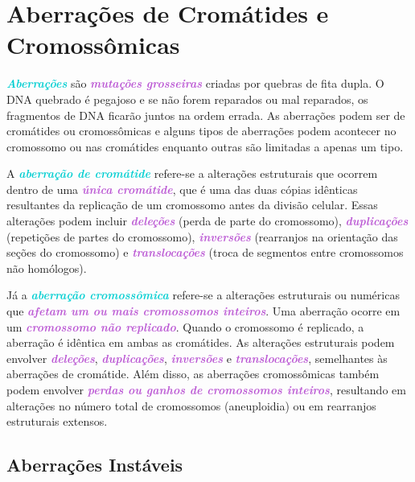 \documentclass[11pt,a4paper]{article}
\begin{document}
\section{Aberrações de Cromátides e Cromossômicas}

	\textcolor{DarkTurquoise}{\textbf{\textit{Aberrações}}} são \textcolor{MediumOrchid}{\textbf{\textit{mutações grosseiras}}} criadas por quebras de fita dupla. O DNA quebrado é pegajoso e se não forem reparados ou mal reparados, os fragmentos de DNA ficarão juntos na ordem errada. As aberrações podem ser de cromátides ou cromossômicas e alguns tipos de aberrações podem acontecer no cromossomo ou nas cromátides enquanto outras são limitadas a apenas um tipo.

	A \textcolor{DarkTurquoise}{\textbf{\textit{aberração de cromátide}}} refere-se a alterações estruturais que ocorrem dentro de uma \textcolor{MediumOrchid}{\textbf{\textit{única cromátide}}}, que é uma das duas cópias idênticas resultantes da replicação de um cromossomo antes da divisão celular. Essas alterações podem incluir \textcolor{MediumOrchid}{\textbf{\textit{deleções}}} (perda de parte do cromossomo), \textcolor{MediumOrchid}{\textbf{\textit{duplicações}}} (repetições de partes do cromossomo), \textcolor{MediumOrchid}{\textbf{\textit{inversões}}} (rearranjos na orientação das seções do cromossomo) e \textcolor{MediumOrchid}{\textbf{\textit{translocações}}} (troca de segmentos entre cromossomos não homólogos). 

	Já a \textcolor{DarkTurquoise}{\textbf{\textit{aberração cromossômica}}} refere-se a alterações estruturais ou numéricas que \textcolor{MediumOrchid}{\textbf{\textit{afetam um ou mais cromossomos inteiros}}}. Uma aberração ocorre em um \textcolor{MediumOrchid}{\textbf{\textit{cromossomo não replicado}}}. Quando o cromossomo é replicado, a aberração é idêntica em ambas as cromátides. As alterações estruturais podem envolver \textcolor{MediumOrchid}{\textbf{\textit{deleções}}}, \textcolor{MediumOrchid}{\textbf{\textit{duplicações}}}, \textcolor{MediumOrchid}{\textbf{\textit{inversões}}} e \textcolor{MediumOrchid}{\textbf{\textit{translocações}}}, semelhantes às aberrações de cromátide. Além disso, as aberrações cromossômicas também podem envolver \textcolor{MediumOrchid}{\textbf{\textit{perdas ou ganhos de cromossomos inteiros}}}, resultando em alterações no número total de cromossomos (aneuploidia) ou em rearranjos estruturais extensos.

\subsection*{Aberrações Instáveis}
\end{document}
